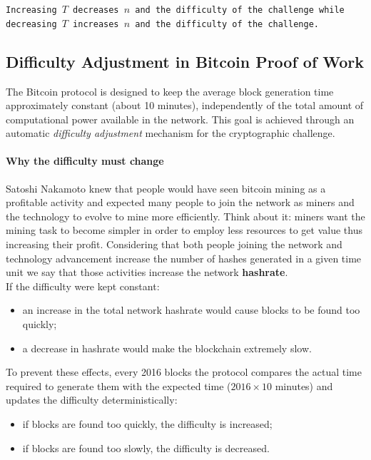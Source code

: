 \documentclass{scrbook}
\begin{document}
\texttt{Increasing $T$ decreases $n$ and the difficulty of the challenge while decreasing $T$ increases $n$ and the difficulty of the challenge.} 

\subsection{Difficulty Adjustment in Bitcoin Proof of Work}

The Bitcoin protocol is designed to keep the average block generation time approximately constant (about 10 minutes), independently of the total amount of computational power available in the network. This goal is achieved through an automatic \emph{difficulty adjustment} mechanism for the cryptographic challenge.

\paragraph{Why the difficulty must change}

Satoshi Nakamoto knew that people would have seen bitcoin mining as a profitable activity and expected many people to join the network as miners and the technology to evolve to mine more efficiently. Think about it: miners want the mining task to become simpler in order to employ less resources to get value thus increasing their profit. Considering that both people joining the network and technology advancement increase the number of hashes generated in a given time unit we say that those activities increase the network \textbf{hashrate}. \\

If the difficulty were kept constant:

\begin{itemize}
    \item an increase in the total network hashrate would cause blocks to be found too quickly;
    \item a decrease in hashrate would make the blockchain extremely slow.
\end{itemize}

To prevent these effects, every 2016 blocks the protocol compares the actual time required to generate them with the expected time ($2016 \times 10$ minutes) and updates the difficulty deterministically:

\begin{itemize}
    \item if blocks are found too quickly, the difficulty is increased;
    \item if blocks are found too slowly, the difficulty is decreased.
\end{itemize}
\end{document}

